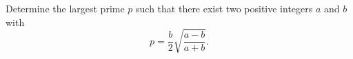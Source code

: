 Determine the largest prime $p$ such that there exist two positive integers $a$ and $b$ with 
$$p=\frac{b}{2}\sqrt{\frac{a-b}{a+b}}.$$
